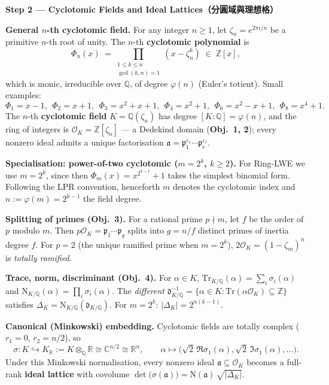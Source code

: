 \documentclass[12pt, a4paper]{article}
\begin{document}
\medskip
\textbf{Step 2 --- Cyclotomic Fields and Ideal Lattices（分圓域與理想格）}

\textbf{General $n$-th cyclotomic field.} For any integer $n\geq 1$, let $\zeta_n=e^{2\pi i/n}$
be a primitive $n$-th root of unity. The $n$-th \textbf{cyclotomic polynomial} is
\[
  \Phi_n(x) \;=\!\!\!\prod_{\substack{1\leq k\leq n\\ \gcd(k,n)=1}}\!\!\!(x-\zeta_n^k)\;\in\;\mathbb{Z}[x],
\]
which is monic, irreducible over $\mathbb{Q}$, of degree $\varphi(n)$ (Euler's totient).
Small examples:
\[
  \Phi_1=x-1,\ \ \Phi_2=x+1,\ \ \Phi_3=x^2+x+1,\ \ \Phi_4=x^2+1,\ \ \Phi_6=x^2-x+1,\ \ \Phi_8=x^4+1.
\]
The $n$-th \textbf{cyclotomic field} $K=\mathbb{Q}(\zeta_n)$ has degree $[K:\mathbb{Q}]=\varphi(n)$,
and the ring of integers is $\mathcal{O}_K=\mathbb{Z}[\zeta_n]$ — a Dedekind domain
(\textbf{Obj.\ 1, 2}); every nonzero ideal admits a unique factorisation
$\mathfrak{a}=\mathfrak{p}_1^{e_1}\cdots\mathfrak{p}_r^{e_r}$.

\textbf{Specialisation: power-of-two cyclotomic ($m=2^k$, $k\geq 2$).} For Ring-LWE we use
$m=2^k$, since then $\Phi_m(x)=x^{2^{k-1}}+1$ takes the simplest binomial form. Following the
LPR convention, henceforth $m$ denotes the cyclotomic index and $n:=\varphi(m)=2^{k-1}$ the
field degree.

\textbf{Splitting of primes (Obj.\ 3).} For a rational prime $p\nmid m$, let $f$ be the order of
$p$ modulo $m$. Then $p\mathcal{O}_K=\mathfrak{p}_1\cdots\mathfrak{p}_g$ splits into $g=n/f$
distinct primes of inertia degree $f$. For $p=2$ (the unique ramified prime when $m=2^k$),
$2\mathcal{O}_K=(1-\zeta_m)^n$ is \textit{totally ramified}.

\textbf{Trace, norm, discriminant (Obj.\ 4).} For $\alpha\in K$,
$\mathrm{Tr}_{K/\mathbb{Q}}(\alpha)=\sum_i\sigma_i(\alpha)$ and
$\mathrm{N}_{K/\mathbb{Q}}(\alpha)=\prod_i\sigma_i(\alpha)$. The \textit{different}
$\mathfrak{d}_{K/\mathbb{Q}}^{-1}=\{\alpha\in K:\mathrm{Tr}(\alpha\mathcal{O}_K)\subseteq\mathbb{Z}\}$
satisfies $\Delta_K=\mathrm{N}_{K/\mathbb{Q}}(\mathfrak{d}_{K/\mathbb{Q}})$. For $m=2^k$:
$|\Delta_K|=2^{n(k-1)}$.

\textbf{Canonical (Minkowski) embedding.} Cyclotomic fields are totally complex ($r_1=0$,
$r_2=n/2$), so
\[
  \sigma\colon K\hookrightarrow K_{\mathbb{R}}:=K\otimes_{\mathbb{Q}}\mathbb{R}\cong\mathbb{C}^{n/2}\cong\mathbb{R}^n,
  \qquad \alpha\mapsto\bigl(\sqrt{2}\,\Re\sigma_1(\alpha),\sqrt{2}\,\Im\sigma_1(\alpha),\ldots\bigr).
\]
Under this Minkowski normalisation, every nonzero ideal $\mathfrak{a}\subseteq\mathcal{O}_K$ becomes
a full-rank \textbf{ideal lattice} with covolume
$\det\bigl(\sigma(\mathfrak{a})\bigr) = \mathrm{N}(\mathfrak{a})\,\sqrt{|\Delta_K|}$.
\end{document}
